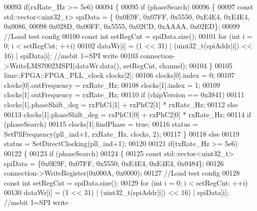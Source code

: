 \begin{DoxyCode}
00093 \textcolor{comment}{    if(rxRate\_Hz >= 5e6)}
00094 \textcolor{comment}{    \{}
00095 \textcolor{comment}{        if (phaseSearch)}
00096 \textcolor{comment}{        \{}
00097 \textcolor{comment}{            const std::vector<uint32\_t> spiData = \{ 0x0E9F, 0x07FF, 0x5550, 0xE4E4, 0xE4E4, 0x0086,}
00098 \textcolor{comment}{                                                    0x028D, 0x00FF, 0x5555, 0x02CD, 0xAAAA, 0x02ED\};}
00099 \textcolor{comment}{            //Load test config}
00100 \textcolor{comment}{            const int setRegCnt = spiData.size();}
00101 \textcolor{comment}{            for (int i = 0; i < setRegCnt; ++i)}
00102 \textcolor{comment}{                dataWr[i] = (1 << 31) | (uint32\_t(spiAddr[i]) << 16) | spiData[i]; //msbit 1=SPI write}
00103 \textcolor{comment}{            connection->WriteLMS7002MSPI(dataWr.data(), setRegCnt, channel);}
00104 \textcolor{comment}{        \}}
00105 \textcolor{comment}{        lime::FPGA::FPGA\_PLL\_clock clocks[2];}
00106 \textcolor{comment}{        clocks[0].index = 0;}
00107 \textcolor{comment}{        clocks[0].outFrequency = rxRate\_Hz;}
00108 \textcolor{comment}{        clocks[1].index = 1;}
00109 \textcolor{comment}{        clocks[1].outFrequency = rxRate\_Hz;}
00110 \textcolor{comment}{        if (chipVersion == 0x3841)}
00111 \textcolor{comment}{            clocks[1].phaseShift\_deg = rxPhC1[1] + rxPhC2[1] * rxRate\_Hz;}
00112 \textcolor{comment}{        else}
00113 \textcolor{comment}{            clocks[1].phaseShift\_deg = rxPhC1[0] + rxPhC2[0] * rxRate\_Hz;}
00114 \textcolor{comment}{        if (phaseSearch)}
00115 \textcolor{comment}{            clocks[1].findPhase = true;}
00116 \textcolor{comment}{        status = SetPllFrequency(pll\_ind+1, rxRate\_Hz, clocks, 2);}
00117 \textcolor{comment}{    \}}
00118 \textcolor{comment}{    else}
00119 \textcolor{comment}{        status = SetDirectClocking(pll\_ind+1);}
00120 \textcolor{comment}{}
00121 \textcolor{comment}{    if(txRate\_Hz >= 5e6)}
00122 \textcolor{comment}{    \{}
00123 \textcolor{comment}{        if (phaseSearch)}
00124 \textcolor{comment}{        \{}
00125 \textcolor{comment}{            const std::vector<uint32\_t> spiData = \{0x0E9F, 0x07FF, 0x5550, 0xE4E4, 0xE4E4, 0x0484\};}
00126 \textcolor{comment}{            connection->WriteRegister(0x000A, 0x0000);}
00127 \textcolor{comment}{            //Load test config}
00128 \textcolor{comment}{            const int setRegCnt = spiData.size();}
00129 \textcolor{comment}{            for (int i = 0; i < setRegCnt; ++i)}
00130 \textcolor{comment}{                dataWr[i] = (1 << 31) | (uint32\_t(spiAddr[i]) << 16) | spiData[i]; //msbit 1=SPI write}

\end{DoxyCode}
